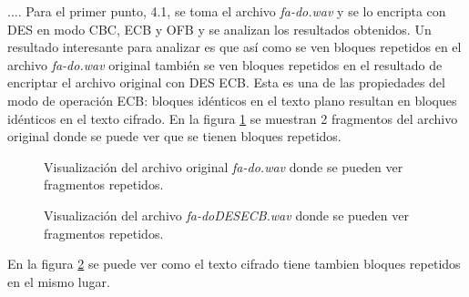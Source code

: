 \documentclass[a4paper,10pt]{article}
\begin{document}
....
Para el primer punto, 4.1, se toma el archivo \emph{fa-do.wav} y se lo encripta
con DES en modo CBC, ECB y OFB y se analizan los resultados obtenidos.
Un resultado interesante para analizar es que as\'i como se ven bloques repetidos
en el archivo \emph{fa-do.wav} original tambi\'en se ven bloques repetidos en el 
resultado de encriptar el archivo original con DES ECB. Esta es una de las propiedades
del modo de operaci\'on ECB: bloques id\'enticos en el texto plano resultan en 
bloques id\'enticos en el texto cifrado. En la figura \ref{fig:41Original} se
muestran 2 fragmentos del archivo original donde se puede ver que se tienen bloques
repetidos.
\begin{figure}
	\begin{center}
	\end{center}
	\caption{Visualización del archivo original \emph{fa-do.wav} donde se pueden ver
		fragmentos repetidos.}
	\label{fig:41Original}
\end{figure}
\begin{figure}
	\begin{center}
	\end{center}
	\caption{Visualización del archivo \emph{fa-doDESECB.wav} donde se pueden ver
		fragmentos repetidos.}
	\label{fig:41ECB}
\end{figure}
En la figura \ref{fig:41ECB} se puede ver como el texto cifrado tiene tambien bloques
repetidos en el mismo lugar. 
\end{document}

